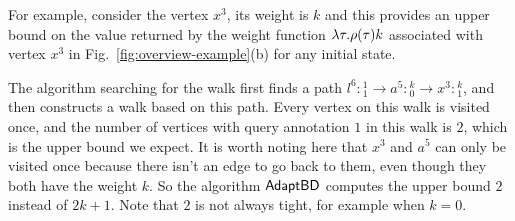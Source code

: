 For example, consider the vertex $x^{3}$, its weight is $k$ and this provides an upper bound on the value returned by the weight function $\lambda \mathtt{\tau}. \rho(\mathtt{\tau})k$ associated with vertex $x^{3}$ in Fig.~\ref{fig:overview-example}(b) for any initial state. 

The algorithm searching for the walk first finds a path $l^6:{}^1_1 \to a^5: {}^k_0 \to x^3: {}^k_1$, and then constructs a walk based on this path. Every vertex on this walk is visited once, and the number of vertices with query annotation $1$ in this walk is $2$, which is the upper bound we expect.
{It is worth noting here that $x^3$ and $a^5$ can only be visited once because there isn't an edge to go back to them, even though they both have the weight $k$}.  So the algorithm $\mathsf{AdaptBD}$ computes the upper bound $2$ instead of $2k+1$. Note that $2$ is not always tight, for example when $k = 0$.
